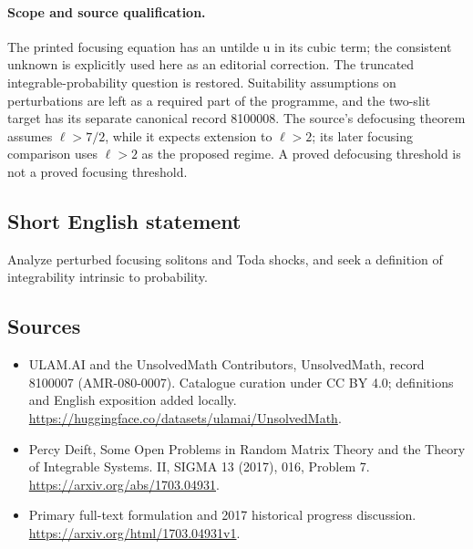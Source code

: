 \documentclass[11pt]{article}
\begin{document}
\paragraph{Scope and source qualification.}The printed focusing equation has an untilde u in its cubic term; the consistent unknown is explicitly used here as an editorial correction. The truncated integrable-probability question is restored. Suitability assumptions on perturbations are left as a required part of the programme, and the two-slit target has its separate canonical record 8100008. The source's defocusing theorem assumes $\ell>7/2$, while it expects extension to $\ell>2$; its later focusing comparison uses $\ell>2$ as the proposed regime. A proved defocusing threshold is not a proved focusing threshold.
\subsection{Short English statement}
Analyze perturbed focusing solitons and Toda shocks, and seek a definition of integrability intrinsic to probability.
\subsection{Sources}
\begin{itemize}
\item[\hypertarget{source:8100007:1}{S1}] ULAM.AI and the UnsolvedMath Contributors, UnsolvedMath, record 8100007 (AMR-080-0007). Catalogue curation under CC BY 4.0; definitions and English exposition added locally.
\url{https://huggingface.co/datasets/ulamai/UnsolvedMath}.
\item[\hypertarget{source:8100007:2}{S2}] Percy Deift, Some Open Problems in Random Matrix Theory and the Theory of Integrable Systems. II, SIGMA 13 (2017), 016, Problem 7.
\url{https://arxiv.org/abs/1703.04931}.
\item[\hypertarget{source:8100007:3}{S3}] Primary full-text formulation and 2017 historical progress discussion.
\url{https://arxiv.org/html/1703.04931v1}.
\end{itemize}
\label{end:8100007}
\end{document}
